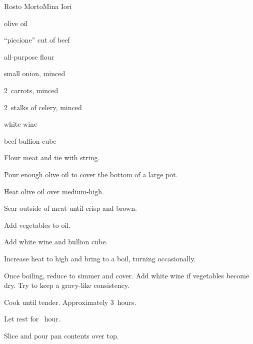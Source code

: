 \begin{recipe}{Rosto Morto}{Mina Iori}{}

\begin{ingredients}
\item olive oil
\item \kgr{1\half} ``piccione'' cut of beef
\item all-purpose flour
\item small onion, minced
\item 2~carrots, minced
\item 2~stalks of celery, minced
\item white wine
\item beef bullion cube
\end{ingredients}

\begin{directions}
\item Flour meat and tie with string.
\item Pour enough olive oil to cover the bottom of a large pot.
\item Heat olive oil over medium-high.
\item Sear outside of meat until crisp and brown.
\item Add vegetables to oil.
\item Add white wine and bullion cube.
\item Increase heat to high and bring to a boil, turning occasionally.
\item Once boiling, reduce to simmer and cover. Add white wine if vegetables become dry. Try to keep a gravy-like consistency.
\item Cook until tender. Approximately 3~hours.
\item Let rest for \half~hour.
\item Slice and pour pan contents over top.
\end{directions}

\hint{}
\end{recipe}
